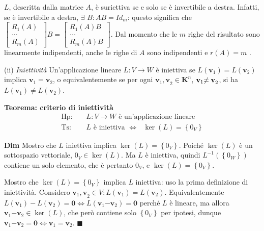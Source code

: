 \documentclass{article}
\begin{document}
$L$, descritta dalla matrice $A$, \`{e} suriettiva se e solo se \`{e}
invertibile a destra. Infatti, se \`{e} invertibile a destra, $\exists $ $%
B:AB=Id_{m}$: questo significa che $\left[ 
\begin{array}{c}
R_{1}\left( A\right) \\ 
... \\ 
R_{m}\left( A\right)%
\end{array}%
\right] B=\left[ 
\begin{array}{c}
R_{1}\left( A\right) B \\ 
... \\ 
R_{m}\left( A\right) B%
\end{array}%
\right] $. Dal momento che le $m$ righe del risultato sono linearmente
indipendenti, anche le righe di $A$ sono indipendenti e $r\left( A\right) =m$%
.

(ii) \emph{Iniettivit\`{a}} Un'applicazione lineare $L:V\rightarrow W$ \`{e}
iniettiva se $L\left( \mathbf{v}_{1}\right) =L\left( \mathbf{v}_{2}\right) $
implica $\mathbf{v}_{1}\mathbf{=v}_{2}$, o equivalentemente se per ogni $%
\mathbf{v}_{1}\mathbf{,v}_{2}\in \mathbf{K}^{n}$, $\mathbf{v}_{1}\mathbf{%
\neq v}_{2}$, si ha $L\left( \mathbf{v}_{1}\right) \neq L\left( \mathbf{v}%
_{2}\right) $.

\textbf{Teorema: criterio di iniettivit\`{a}}%
\begin{eqnarray*}
\text{Hp}\text{: } &&L:V\rightarrow W\text{ \`{e} un'applicazione lineare} \\
\text{Ts}\text{: } &&L\text{ \`{e} iniettiva }\Longleftrightarrow \text{ }%
\ker \left( L\right) =\left\{ 0_{V}\right\}
\end{eqnarray*}

\textbf{Dim} Mostro che $L$ iniettiva implica $\ker \left( L\right) =\left\{
0_{V}\right\} $. Poich\'{e} $\ker \left( L\right) $ \`{e} un sottospazio
vettoriale, $0_{V}\in \ker \left( L\right) $. Ma $L$ \`{e} iniettiva, quindi 
$L^{-1}\left( \left\{ 0_{W}\right\} \right) $ contiene un solo elemento, che 
\`{e} pertanto $0_{V}$, e $\ker \left( L\right) =\left\{ 0_{V}\right\} $.

Mostro che $\ker \left( L\right) =\left\{ 0_{V}\right\} $ implica $L$
iniettiva: uso la prima definizione di iniettivit\`{a}. Considero $\mathbf{v}%
_{1}\mathbf{,v}_{2}\in V:L\left( \mathbf{v}_{1}\right) =L\left( \mathbf{v}%
_{2}\right) $. Equivalentemente $L\left( \mathbf{v}_{1}\right) -L\left( 
\mathbf{v}_{2}\right) =\mathbf{0}\Longleftrightarrow L\left( \mathbf{v}_{1}%
\mathbf{-v}_{2}\right) =\mathbf{0}$ perch\'{e} $L$ \`{e} lineare, ma allora $%
\mathbf{v}_{1}\mathbf{-v}_{2}\in \ker \left( L\right) $, che per\`{o}
contiene solo $\left\{ 0_{V}\right\} $ per ipotesi, dunque $\mathbf{v}_{1}%
\mathbf{-v}_{2}\mathbf{=0\Longleftrightarrow v}_{1}=\mathbf{v}_{2}$. $%
\blacksquare $
\end{document}

